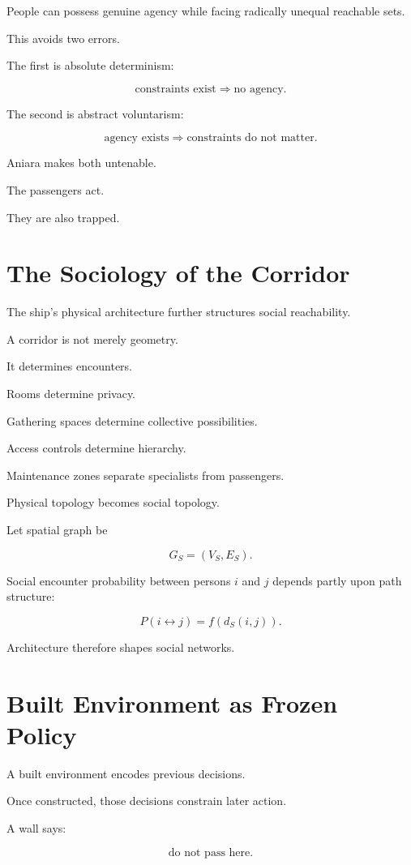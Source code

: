 \documentclass[11pt,oneside]{book}
\theoremstyle{definition}
\theoremstyle{remark}
\begin{document}
People can possess genuine agency while facing radically unequal reachable sets.

This avoids two errors.

The first is absolute determinism:

\[
\text{constraints exist}
\Rightarrow
\text{no agency}.
\]

The second is abstract voluntarism:

\[
\text{agency exists}
\Rightarrow
\text{constraints do not matter}.
\]

Aniara makes both untenable.

The passengers act.

They are also trapped.

\section{The Sociology of the Corridor}

The ship's physical architecture further structures social reachability.

A corridor is not merely geometry.

It determines encounters.

Rooms determine privacy.

Gathering spaces determine collective possibilities.

Access controls determine hierarchy.

Maintenance zones separate specialists from passengers.

Physical topology becomes social topology.

Let spatial graph be

\[
G_S=(V_S,E_S).
\]

Social encounter probability between persons \(i\) and \(j\) depends partly upon path structure:

\[
P(i\leftrightarrow j)
=
f(d_S(i,j)).
\]

Architecture therefore shapes social networks.

\section{Built Environment as Frozen Policy}

A built environment encodes previous decisions.

Once constructed, those decisions constrain later action.

A wall says:

\[
\text{do not pass here}.
\]
\end{document}
